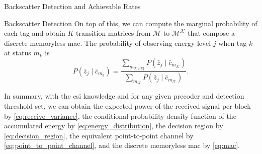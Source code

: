 \documentclass[journal]{IEEEtran}
\begin{document}
\begin{section}{Backscatter Detection and Achievable Rates}
\begin{subsection}{Backscatter Detection}
			On top of this, we can compute the marginal probability of each tag and obtain $K$ transition matrices from $\mathcal{M}$ to $\mathcal{M^K}$ that compose a discrete memoryless \gls{mac}. The probability of observing energy level $j$ when tag $k$ at status $m_k$ is
			\begin{equation}
				P(\bar{z}_j \mid \bar{c}_{m_k}) = \frac{\sum_{m_{\mathcal{K} \setminus \{k\}}} P(\bar{z}_j \mid \bar{c}_{m_{\mathcal{K}}})}{\sum_{m_{\mathcal{K}}} P(\bar{z}_j \mid \bar{c}_{m_{\mathcal{K}}})}.
				\label{eq:mac}
			\end{equation}

			In summary, with the \gls{csi} knowledge and for any given precoder and detection threshold set, we can obtain the expected power of the received signal per block by \eqref{eq:receive_variance}, the conditional probability density function of the accumulated energy by \eqref{eq:energy_distribution}, the decision region by \eqref{eq:decision_region}, the equivalent point-to-point channel by \eqref{eq:point_to_point_channel}, and the discrete memoryless \gls{mac} by \eqref{eq:mac}.
		\end{subsection}


\end{section}
\end{document}
